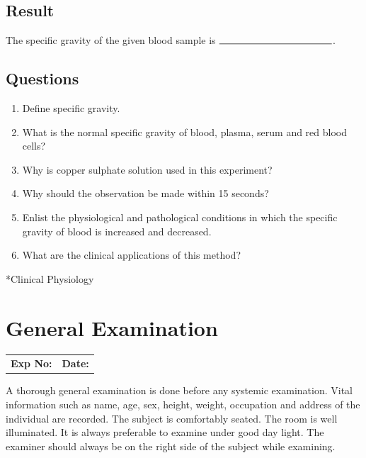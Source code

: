 \documentclass[a4paper,12pt,openany,oneside]{book}
\makeatletter
\renewcommand\part{%
       \if@openright
         \cleardoublepage
       \else
         \clearpage
       \fi
       \thispagestyle{empty}%
       \if@twocolumn
         \onecolumn
         \@tempswatrue
       \else
         \@tempswafalse
       \fi
       \null\vfil
       \secdef\@part\@spart}
\makeatother
\begin{document}
															\section*{Result}
															The specific gravity of the given blood sample is $\rule{4cm}{.5pt}$.
															\section*{Questions}
															\begin{enumerate}
																\item{Define specific gravity.}
																\item{What is the normal specific gravity of blood, plasma, serum and red blood cells?}
																\item{Why is copper sulphate solution used in this experiment?}
																\item{Why should the observation be made within 15 seconds?}
																\item{Enlist the physiological and pathological conditions in which the specific gravity of blood is increased and decreased.}
																\item{What are the clinical applications of this method? }
															\end{enumerate}
															\part*{Clinical Physiology}
															\chapter*{\centering General Examination}

															\begin{tabular}{p{4.5in} p{1in}}
																\textbf{Exp No:}  & \textbf{Date:}\\
															\end{tabular}
															A thorough general examination is done before any systemic examination. Vital information such as name, age, sex, height, weight, occupation and address of the individual are recorded. The subject is comfortably seated. The room is well illuminated. It is always preferable to examine under good day light. The examiner should always be on the right side of the subject while examining.
\end{document}
